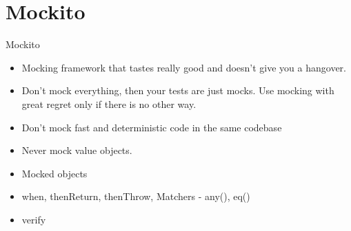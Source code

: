 \section{Mockito}

\begin{frame}[fragile]{Mockito}
\begin{itemize}
    \item Mocking framework that tastes really good and doesn't give you a hangover.
    \item Don't mock everything, then your tests are just mocks. Use mocking with great regret only if there is no other way.
    \item Don't mock fast and deterministic code in the same codebase
    \item Never mock value objects.
    \item Mocked objects
    \item when, thenReturn, thenThrow, Matchers - any(), eq()
    \item verify
\end{itemize}
\end{frame}
